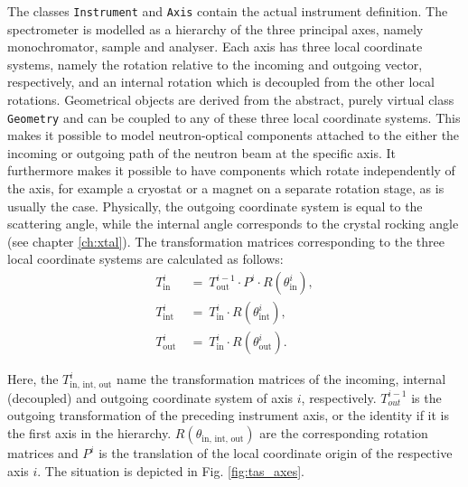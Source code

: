 The classes \lstinline[language=C++]|Instrument| and \lstinline[language=C++]|Axis| contain the actual instrument definition.
The spectrometer is modelled as a hierarchy of the three principal axes, namely monochromator, sample and analyser.
Each axis has three local coordinate systems, namely the rotation relative to the incoming and outgoing vector, respectively,
and an internal rotation which is decoupled from the other local rotations.
Geometrical objects are derived from the abstract, purely virtual class \lstinline[language=C++]|Geometry| and can be
coupled to any of these three local coordinate systems.
This makes it possible to model neutron-optical components attached to the either the incoming or outgoing path of the
neutron beam at the specific axis. 
It furthermore makes it possible to have components which rotate independently of the axis, for example a cryostat or
a magnet on a separate rotation stage, as is usually the case.
Physically, the outgoing coordinate system is equal to the scattering angle, while the internal angle corresponds
to the crystal rocking angle (see chapter \ref{ch:xtal}).
The transformation matrices corresponding to the three local coordinate systems are calculated as follows:
\begin{equation}
\begin{split}
	T_{\mathrm{in}}^{i} & \ =\  T_{\mathrm{out}}^{i-1} \cdot P^{i} \cdot R\left(\theta_{\mathrm{in}}^{i}\right), \\
	T_{\mathrm{int}}^{i} & \ =\  T_{\mathrm{in}}^{i} \cdot R\left(\theta_{\mathrm{int}}^{i}\right), \\
	T_{\mathrm{out}}^{i} & \ =\  T_{\mathrm{in}}^{i} \cdot R\left(\theta_{\mathrm{out}}^{i}\right).
\end{split}
\end{equation}

Here, the $T_{\mathrm{in,\, int,\, out}}^{i}$ name the transformation matrices of the incoming, internal (decoupled) 
and outgoing coordinate system of axis $i$, respectively.
$T_{out}^{i-1}$ is the outgoing transformation of the preceding instrument axis, or the identity if it is the first axis 
in the hierarchy.
$R\left(\theta_{\mathrm{in,\, int,\, out}}\right)$ are the corresponding rotation matrices and $P^i$ is the translation
of the local coordinate origin of the respective axis $i$.
The situation is depicted in Fig. \ref{fig:tas_axes}.


